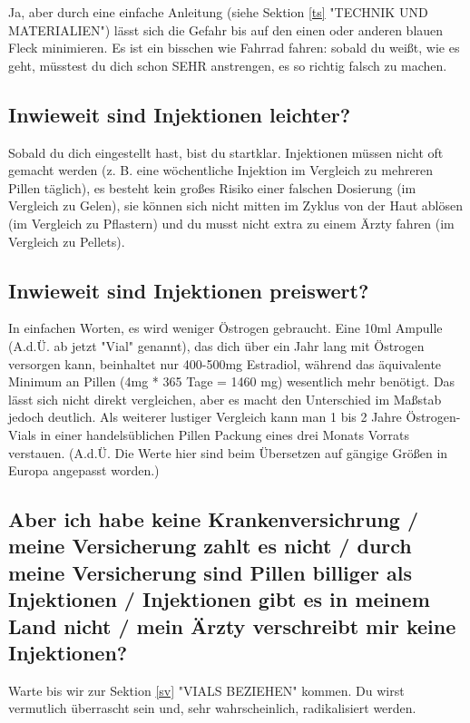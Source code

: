 \documentclass{article}
\begin{document}
Ja, aber durch eine einfache Anleitung (siehe Sektion \ref{ts} "TECHNIK UND MATERIALIEN") lässt sich die Gefahr bis auf den einen oder anderen blauen Fleck minimieren. Es ist ein bisschen wie Fahrrad fahren: sobald du weißt, wie es geht, müsstest du dich schon SEHR anstrengen, es so richtig falsch zu machen.

\subsection{Inwieweit sind Injektionen leichter?}

Sobald du dich eingestellt hast, bist du startklar. Injektionen müssen nicht oft gemacht werden (z. B. eine wöchentliche Injektion im Vergleich zu mehreren Pillen täglich), es besteht kein großes Risiko einer falschen Dosierung (im Vergleich zu Gelen), sie können sich nicht mitten im Zyklus von der Haut ablösen (im Vergleich zu Pflastern) und du musst nicht extra zu einem Ärzty fahren (im Vergleich zu Pellets).

\subsection{Inwieweit sind Injektionen preiswert?}

In einfachen Worten, es wird weniger Östrogen gebraucht. Eine 10ml Ampulle (A.d.Ü. ab jetzt "Vial" genannt), das dich über ein Jahr lang mit Östrogen versorgen kann, beinhaltet nur 400-500mg Estradiol, während das äquivalente Minimum an Pillen (4mg * 365 Tage = 1460 mg) wesentlich mehr benötigt. Das lässt sich nicht direkt vergleichen, aber es macht den Unterschied im Maßstab jedoch deutlich. Als weiterer lustiger Vergleich kann man 1 bis 2 Jahre Östrogen-Vials in einer handelsüblichen Pillen Packung eines drei Monats Vorrats verstauen. (A.d.Ü. Die Werte hier sind beim Übersetzen auf gängige Größen in Europa angepasst worden.)

\subsection{Aber ich habe keine Krankenversichrung / meine Versicherung zahlt es nicht / durch meine Versicherung sind Pillen billiger als Injektionen / Injektionen gibt es in meinem Land nicht / mein Ärzty verschreibt mir keine Injektionen?}

Warte bis wir zur Sektion \ref{sv} "VIALS BEZIEHEN" kommen. Du wirst vermutlich überrascht sein und, sehr wahrscheinlich, radikalisiert werden.
\end{document}
